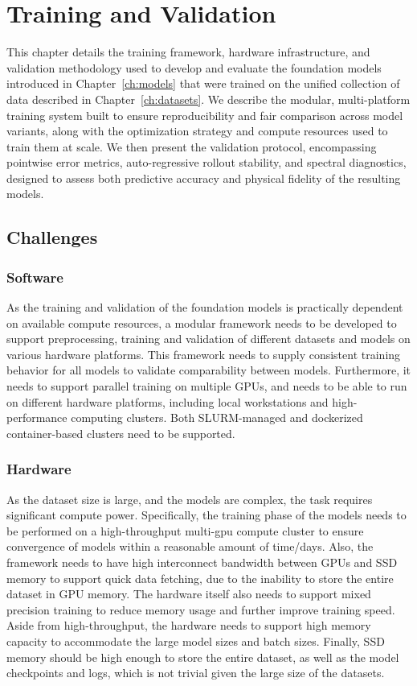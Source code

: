 \chapter{Training and Validation}\label{ch:training}

This chapter details the training framework, hardware infrastructure, and validation methodology used to develop and evaluate the foundation models introduced in Chapter~\ref{ch:models} that were trained on the unified collection of data described in Chapter~\ref{ch:datasets}. We describe the modular, multi-platform training system built to ensure reproducibility and fair comparison across model variants, along with the optimization strategy and compute resources used to train them at scale. We then present the validation protocol, encompassing pointwise error metrics, auto-regressive rollout stability, and spectral diagnostics, designed to assess both predictive accuracy and physical fidelity of the resulting models.

\section{Challenges}

\subsection{Software}

As the training and validation of the foundation models is practically dependent on available compute resources, a modular framework needs to be developed to support preprocessing, training and validation of different datasets and models on various hardware platforms. This framework needs to supply consistent training behavior for all models to validate comparability between models. Furthermore, it needs to support parallel training on multiple GPUs, and needs to be able to run on different hardware platforms, including local workstations and high-performance computing clusters. Both SLURM-managed and dockerized container-based clusters need to be supported. 

\subsection{Hardware}

As the dataset size is large, and the models are complex, the task requires significant compute power. Specifically, the training phase of the models needs to be performed on a high-throughput multi-gpu compute cluster to ensure convergence of models within a reasonable amount of time/days. Also, the framework needs to have high interconnect bandwidth between GPUs and SSD memory to support quick data fetching, due to the inability to store the entire dataset in GPU memory. The hardware itself also needs to support mixed precision training to reduce memory usage and further improve training speed. 
Aside from high-throughput, the hardware needs to support high memory capacity to accommodate the large model sizes and batch sizes. Finally, SSD memory should be high enough to store the entire dataset, as well as the model checkpoints and logs, which is not trivial given the large size of the datasets.

